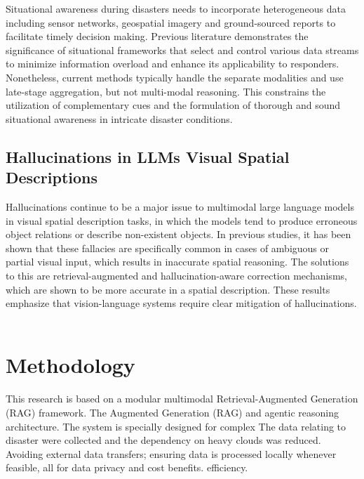 \documentclass[conference]{IEEEtran}
\begin{document}
Situational awareness during disasters needs to incorporate heterogeneous data including sensor networks, geospatial imagery and ground-sourced reports to facilitate timely decision making. Previous literature demonstrates the significance of situational frameworks that select and control various data streams to minimize information overload and enhance its applicability to responders. Nonetheless, current methods typically handle the separate modalities and use late-stage aggregation, but not multi-modal reasoning. This constrains the utilization of complementary cues and the formulation of thorough and sound situational awareness in intricate disaster conditions.~\cite{b10}


\subsection{Hallucinations in LLMs Visual Spatial Descriptions}
Hallucinations continue to be a major issue to multimodal large language models in visual spatial description tasks, in which the models tend to produce erroneous object relations or describe non-existent objects. In previous studies, it has been shown that these fallacies are specifically common in cases of ambiguous or partial visual input, which results in inaccurate spatial reasoning. The solutions to this are retrieval-augmented and hallucination-aware correction mechanisms, which are shown to be more accurate in a spatial description. These results emphasize that vision-language systems require clear mitigation of hallucinations. ~\cite{b14}




\section{Methodology}

This research is based on a modular multimodal Retrieval-Augmented Generation (RAG) framework. The Augmented Generation (RAG) and agentic reasoning architecture. The system is specially designed for complex The data relating to disaster were collected and the dependency on heavy clouds was reduced. Avoiding external data transfers; ensuring data is processed locally whenever feasible, all for data privacy and cost benefits. efficiency.
\end{document}
